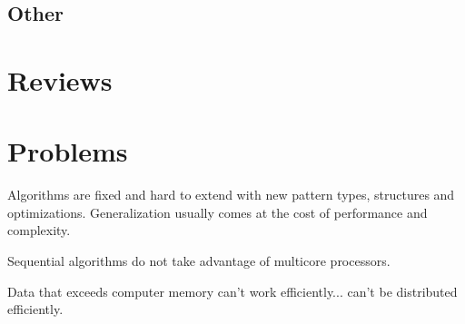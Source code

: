 
\subsection{Other}

\cite{NetworkMotifsDiscovery, GenericMotifSequential}

\section{Reviews}

\cite{CombinatorialSubtle, SurveyDNAMotif, SurveyMotifDiscovery}


\section{Problems}

\WIP

Algorithms are fixed and hard to extend with new pattern types, structures and optimizations. Generalization usually comes at the cost of performance and complexity. 

Sequential algorithms do not take advantage of multicore processors. 

Data that exceeds computer memory can't work efficiently... can't be distributed efficiently. 